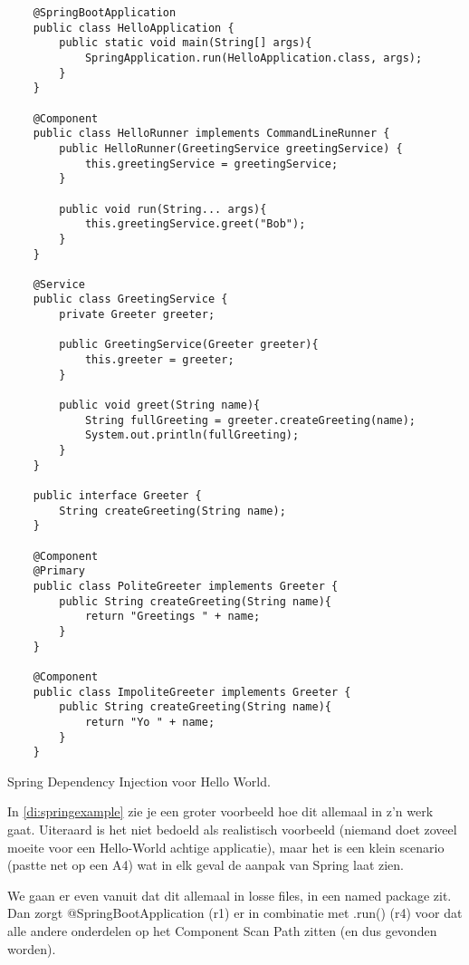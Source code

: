 \begin{listing}[H]
    \begin{verbatim}
    @SpringBootApplication
    public class HelloApplication {
        public static void main(String[] args){
            SpringApplication.run(HelloApplication.class, args);
        }
    }

    @Component
    public class HelloRunner implements CommandLineRunner {
        public HelloRunner(GreetingService greetingService) {
            this.greetingService = greetingService;
        }

        public void run(String... args){
            this.greetingService.greet("Bob");
        }
    }

    @Service
    public class GreetingService {
        private Greeter greeter;

        public GreetingService(Greeter greeter){
            this.greeter = greeter;
        }

        public void greet(String name){
            String fullGreeting = greeter.createGreeting(name);
            System.out.println(fullGreeting);
        }
    }

    public interface Greeter {
        String createGreeting(String name);
    }

    @Component
    @Primary
    public class PoliteGreeter implements Greeter {
        public String createGreeting(String name){
            return "Greetings " + name;
        } 
    }

    @Component
    public class ImpoliteGreeter implements Greeter {
        public String createGreeting(String name){
            return "Yo " + name;
        } 
    }
    \end{verbatim}
    \caption{Spring Dependency Injection voor Hello World.}
    \label{di:springexample}
\end{listing}

In \ref{di:springexample} zie je een groter voorbeeld hoe dit allemaal in z'n werk gaat. Uiteraard is het niet
bedoeld als realistisch voorbeeld (niemand doet zoveel moeite voor een Hello-World achtige applicatie), maar het is 
een klein scenario (pastte net op een A4) wat in elk geval de aanpak van Spring laat zien.

We gaan er even vanuit dat dit allemaal in losse files, in een named package zit. Dan zorgt @SpringBootApplication (r1)
er in combinatie met .run() (r4) voor dat alle andere onderdelen op het Component Scan Path zitten (en dus gevonden worden).

